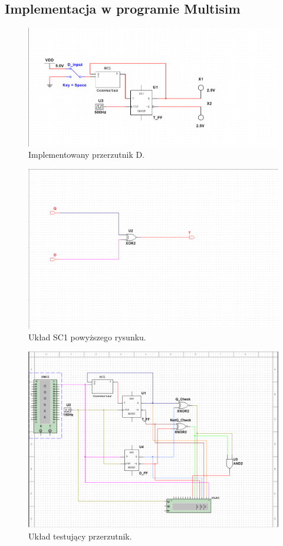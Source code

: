 \documentclass{article}
\begin{document}
\subsection{Implementacja w programie Multisim}
\begin{figure}[H]
\caption{Implementowany przerzutnik D.}
\includegraphics[width = \textwidth]{2aimp}
\end{figure}
\begin{figure}[H]
\caption{Układ SC1 powyższego rysunku.}
\includegraphics[width = \textwidth]{2asc1}
\end{figure}
\begin{figure}[H]
\caption{Układ testujący przerzutnik.}
\includegraphics[width = \textwidth]{2atest}
\end{figure}
\end{document}
